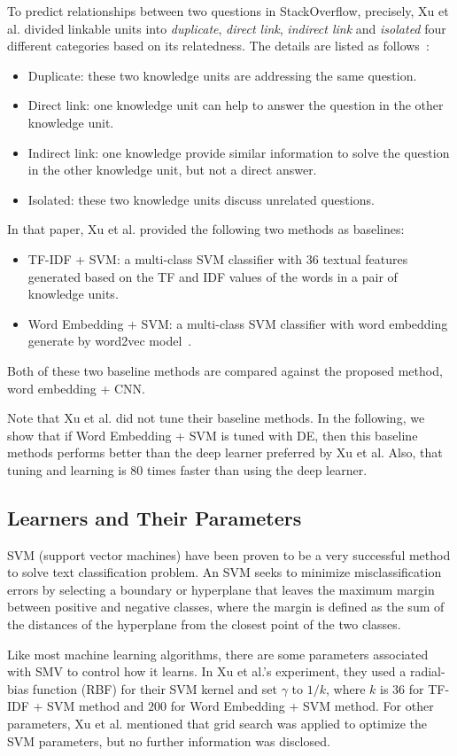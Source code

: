 \documentclass[sigconf,review, anonymous]{acmart}
\theoremstyle{break}
\newcommand{\bi}{\begin{itemize}[leftmargin=0.4cm]}
\newcommand{\ei}{\end{itemize}}
\begin{document}
To predict relationships between two questions in StackOverflow,  precisely, 
Xu et al.  divided linkable  units 
into {\it duplicate}, {\it direct link}, {\it indirect link} and {\it isolated}  four different categories 
based on its relatedness. The details are listed as follows~\cite{xu2016predicting}:



\bi
\item Duplicate:  these two knowledge units are addressing the same question.
\item Direct link: one knowledge unit can help to answer the question in the other knowledge unit.
\item Indirect link: one knowledge provide similar information to solve the question in the other knowledge unit, but not a direct answer.
\item Isolated: these two knowledge units discuss unrelated questions.
\ei 
In that paper, Xu et al. provided the following two methods as baselines:

\bi
\item TF-IDF + SVM: a multi-class SVM classifier with  36 textual features generated  based on the 
TF and IDF values of the words in a pair of knowledge units. 
\item Word Embedding + SVM:  a multi-class SVM classifier with word embedding generate by word2vec model~\cite{mikolov2013distributed}.
\ei
Both of these two baseline methods are compared against the proposed method, word embedding + CNN. 

Note that Xu et al. did not tune their baseline methods. In the following, 
we show that if Word Embedding + SVM is tuned with DE, then this baseline
methods performs better than the deep learner preferred by Xu et al.
Also, that tuning and learning is 80 times faster than using the deep learner. 


\subsection{Learners and Their Parameters}
SVM (support vector machines) have been proven to be a very successful method to solve
text classification problem. An SVM  seeks to minimize misclassification
errors by selecting a boundary or hyperplane that leaves
the maximum margin between positive and negative classes, where the
margin is defined as the sum of the distances of the
hyperplane from the closest point of the two classes\cite{joachims1998text}.

Like most machine learning algorithms, there are some parameters associated with
SMV to control how it learns.  In Xu et al.'s experiment, they used a radial-bias function  (RBF) for their SVM kernel
and set $\gamma$ to $1/k$, where $k$ is $36$ for TF-IDF + SVM method
and $200$ for Word Embedding + SVM method. For other parameters, 
Xu et al. mentioned that grid search was applied to optimize the SVM parameters, 
but no further information was disclosed. 
\end{document}
